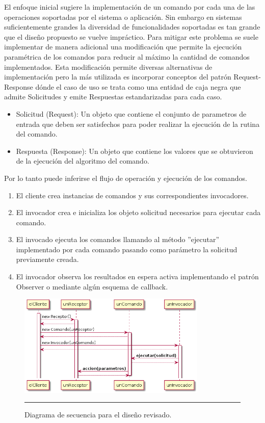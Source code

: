El enfoque inicial sugiere la implementación de un comando
por cada una de las operaciones soportadas por el sistema o aplicación. Sin embargo en sistemas suficientemente grandes la diversidad de funcionalidades soportadas es tan grande que el diseño propuesto se vuelve impráctico.
Para mitigar este problema se suele implementar de manera adicional una modificación que permite la ejecución paramétrica de los comandos para reducir al máximo la cantidad de comandos implementados.
Esta modificación permite diversas alternativas de implementación pero la más utilizada es incorporar conceptos del patrón Request-Response dónde el caso de uso se trata como una entidad de caja negra que admite Solicitudes y emite Respuestas estandarizadas para cada caso.
\begin{itemize}
	\item Solicitud (Request): Un objeto que contiene el conjunto de parametros de entrada que deben ser satisfechos para poder realizar la ejecución de la rutina del comando.
	\item Respuesta (Response): Un objeto que contiene los valores que se obtuvieron de la ejecución del algoritmo del comando.
\end{itemize}

Por lo tanto puede inferirse el flujo de operación y ejecución de los comandos.

\begin{enumerate}
\item El cliente crea instancias de comandos y sus correspondientes invocadores. 
\item El invocador crea e inicializa los objeto solicitud necesarios para ejecutar cada comando.
\item El invocado ejecuta los comandos llamando al método ''ejecutar'' implementado por cada comando pasando como parámetro la solicitud previamente creada.
\item El invocador observa los resultados en espera activa implementando el patrón Observer o mediante algún esquema de callback.
\end{enumerate}

\begin{figure}[htbp]
	\centering
	\includegraphics[width=0.8\textwidth]{Figures/uml_sequence_commander_req_resp.png}
	\rule{35em}{1pt}
	\caption[Commander Review]{Diagrama de secuencia para el diseño revisado.}
	\label{fig:uml_commander_sequence_req_resp}
\end{figure}

